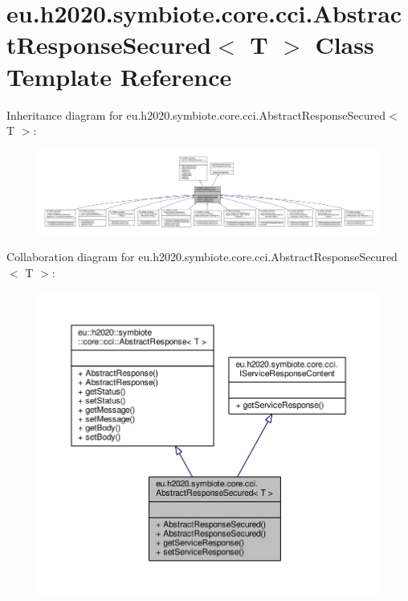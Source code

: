 \hypertarget{classeu_1_1h2020_1_1symbiote_1_1core_1_1cci_1_1AbstractResponseSecured}{}\section{eu.\+h2020.\+symbiote.\+core.\+cci.\+Abstract\+Response\+Secured$<$ T $>$ Class Template Reference}
\label{classeu_1_1h2020_1_1symbiote_1_1core_1_1cci_1_1AbstractResponseSecured}


Inheritance diagram for eu.\+h2020.\+symbiote.\+core.\+cci.\+Abstract\+Response\+Secured$<$ T $>$\+:
\nopagebreak
\begin{figure}[H]
\begin{center}
\leavevmode
\includegraphics[width=350pt]{classeu_1_1h2020_1_1symbiote_1_1core_1_1cci_1_1AbstractResponseSecured__inherit__graph}
\end{center}
\end{figure}


Collaboration diagram for eu.\+h2020.\+symbiote.\+core.\+cci.\+Abstract\+Response\+Secured$<$ T $>$\+:
\nopagebreak
\begin{figure}[H]
\begin{center}
\leavevmode
\includegraphics[width=350pt]{classeu_1_1h2020_1_1symbiote_1_1core_1_1cci_1_1AbstractResponseSecured__coll__graph}
\end{center}
\end{figure}

